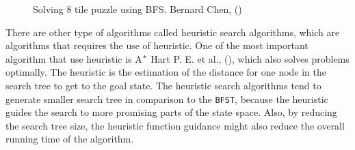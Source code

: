 \iftrue
\begin{landscape}
\begin{figure}[htb]

\resizebox{\dimexpr\linewidth-1cm}{!}{%
\begin{forest}
[\usebox\myboxbfsone
  [\usebox\myboxbfstwo
	[\usebox\myboxbfsfive
		[\usebox\myboxbfsten
			[\usebox\myboxbfstwenty
				[\usebox\myboxbfsthirtyfour]
				[\usebox\myboxbfsthirtyfive]			
			]		
		]
		[\usebox\myboxbfseleven
			[\usebox\myboxbfstwentyone
				[\usebox\myboxbfsthirtysix]
				[\usebox\myboxbfsthirtyseven]			
			]
			[\usebox\myboxbfstwentytwo
				[\usebox\myboxbfsthirtyeight]
				[\usebox\myboxbfsthirtynine]			
			]
			[\usebox\myboxbfstwentythree
				[\usebox\myboxbfsforty]
				[\usebox\myboxbfsfortyone]			
			]		
		]	
	]  
  ]
  [\usebox\myboxbfsthree
	[\usebox\myboxbfssix
		[\usebox\myboxbfstwelve
			[\usebox\myboxbfstwentyfour
				[\usebox\myboxbfsfortytwo]
				[\usebox\myboxbfsfortythree]			
			]		
		]
		[\usebox\myboxbfsthirteen
			[\usebox\myboxbfstwentyfive
				[\usebox\myboxbfsfortyfour]
				[\usebox\myboxbfsfortyfive]			
			]		
		]	
	]
	[\usebox\myboxbfsseven
		[\usebox\myboxbfsfourteen
			[\usebox\myboxbfstwentysix
				[\usebox\myboxbfsfortysix]			
			]		
		]
		[\usebox\myboxbfsfifteen
			[\usebox\myboxbfstwentyseven]		
		]	
	]
	[\usebox\myboxbfseight
		[\usebox\myboxbfssixteen
			[\usebox\myboxbfstwentyeight]		
		]
		[\usebox\myboxbfsseventeen
			[\usebox\myboxbfstwentynine]		
		]	
	]  
  ]
  [\usebox\myboxbfsfour
	[\usebox\myboxbfsnine
		[\usebox\myboxbfseighteen
			[\usebox\myboxbfsthirty]
			[\usebox\myboxbfsthirtyone]
			[\usebox\myboxbfsthirtytwo]
		]
		[\usebox\myboxbfsnineteen
			[\usebox\myboxbfsthirtythree]		
		]
	]  
  ]
]
\end{forest}
}
\caption{Solving 8 tile puzzle using BFS. Bernard Chen, (\citeyear{bernard2011})} \label{fig:bfs_solution}
\end{figure}
\end{landscape}
\fi

There are other type of algorithms called heuristic search algorithms, which are algorithms that requires the use of heuristic. One of the most important algorithm that use heuristic is A$\sp{*}$ Hart P. E. et al., (\citeyear{hart1968formal}), which also solves problems optimally. The heuristic is the estimation of the distance for one node in the search tree to get to the goal state. The heuristic search algorithms tend to generate smaller search tree in comparison to the \texttt{BFST}, because the heuristic guides the search to more promising parts of the state space. Also, by reducing the search tree size, the heuristic function guidance might also reduce the overall running time of the algorithm.

